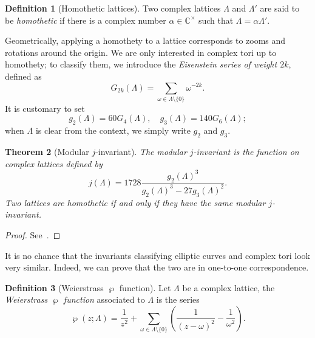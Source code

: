 \documentclass[10pt]{article}
\theoremstyle{plain}
\newtheorem{theorem}{Theorem}
\theoremstyle{definition}
\newtheorem{definition}[theorem]{Definition}
\begin{document}
\begin{definition}[Homothetic lattices]
  Two complex lattices $Λ$ and $Λ'$ are said to be \emph{homothetic}
  if there is a complex number $α∈ℂ^{×}$ such that $Λ=αΛ'$.
\end{definition}

Geometrically, applying a homothety to a lattice corresponds to zooms
and rotations around the origin. %
We are only interested in complex tori up to homothety; to classify
them, we introduce the \emph{Eisenstein series of weight $2k$},
defined as
\[G_{2k}(Λ) = \sum_{ω∈Λ\setminus\{0\}}ω^{-2k}.\]
It is customary to set
\[g_2(Λ) = 60G_4(Λ), \quad g_3(Λ) = 140G_6(Λ);\] %
when $Λ$ is clear from the context, we simply write $g_2$ and $g_3$.

\begin{theorem}[Modular $j$-invariant]
  \label{th:modular-j}
  The \emph{modular $j$-invariant} is the function on complex lattices
  defined by
  \[j(Λ) = 1728 \frac{g_2(Λ)^3}{g_2(Λ)^3 - 27g_3(Λ)^2}.\] %
  Two lattices are homothetic if and only if they have the same
  modular $j$-invariant.
\end{theorem}
\begin{proof}
  See~\cite[I, Th.~4.1]{silverman:advanced}.
\end{proof}

It is no chance that the invariants classifying elliptic curves and
complex tori look very similar. %
Indeed, we can prove that the two are in one-to-one correspondence.

\begin{definition}[Weierstrass $℘$ function]
  Let $Λ$ be a complex lattice, the \emph{Weierstrass $℘$ function}
  associated to $Λ$ is the series
  \[℘(z;Λ) = \frac{1}{z^2} + \sum_{ω∈Λ\setminus\{0\}} \left(\frac{1}{(z-ω)^2} - \frac{1}{ω^2}\right).\]
\end{definition}
\end{document}
